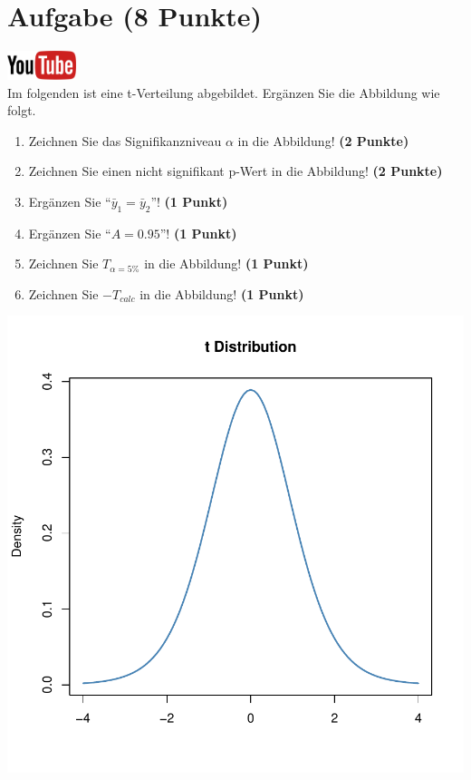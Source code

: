 \documentclass[a4paper, 10pt]{scrartcl}\usepackage[]{graphicx}\usepackage[]{xcolor}
\makeatletter
\def\maxwidth{ %
  \ifdim\Gin@nat@width>\linewidth
    \linewidth
  \else
    \Gin@nat@width
  \fi
}
\makeatother
\begin{document}
 
\clearpage

\section{Aufgabe \hfill (8 Punkte)}

\hfill\href{https://youtu.be/32JjH1eyuTU}{\includegraphics[width =
  2cm]{img/youtube}}\\[1Ex]



Im folgenden ist eine t-Verteilung abgebildet. Erg{\"a}nzen Sie die Abbildung wie folgt.

\begin{enumerate}
\item Zeichnen Sie das Signifikanzniveau $\alpha$ in die Abbildung! \textbf{(2 Punkte)} 
\item Zeichnen Sie einen nicht signifikant p-Wert in die Abbildung! \textbf{(2 Punkte)} 
\item Erg{\"a}nzen Sie "`$\bar{y}_1 = \bar{y}_2$"'! \textbf{(1 Punkt)} 
\item Erg{\"a}nzen Sie "`$A = 0.95$"'! \textbf{(1 Punkt)}
\item Zeichnen Sie $T_{\alpha=5\%}$ in die Abbildung! \textbf{(1 Punkt)} 
\item Zeichnen Sie $-T_{calc}$ in die Abbildung! \textbf{(1 Punkt)} 
\end{enumerate}



{\centering \includegraphics[width=\maxwidth]{img/statistisches-testen-3-1} 

}
\end{document}
